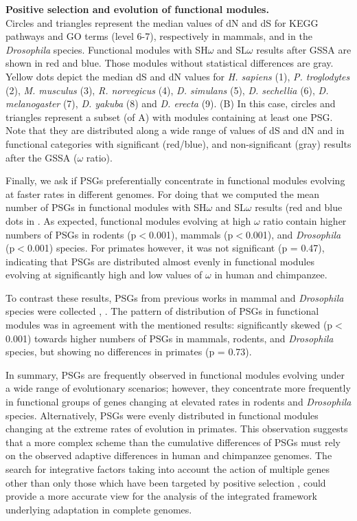\begin{FPfigure}
\caption[ Positive selection and evolution of functional modules.]{{\bf  Positive selection and evolution of functional modules.} \\Circles and triangles represent the median values of dN and dS for KEGG pathways and GO terms (level 6-7), respectively in mammals, and in the \textit{Drosophila} species. Functional modules with SH$\omega$ and SL$\omega$ results after GSSA are shown in red and blue. Those modules without statistical differences are gray. Yellow dots depict the median dS and dN values for \textit{H. sapiens} (1), \textit{P. troglodytes} (2), \textit{M. musculus} (3), \textit{R. norvegicus} (4), \textit{D. simulans} (5), \textit{D. sechellia} (6), \textit{D. melanogaster} (7), \textit{D. yakuba} (8) and \textit{D. erecta} (9). (B) In this case, circles and triangles represent a subset (of A) with modules containing at least one PSG. Note that they are distributed along a wide range of values of dS and dN and in functional categories with significant (red/blue), and non-significant (gray) results after the GSSA ($\omega$ ratio).} 
\label{fig:gssa_psgs}
\end{FPfigure}

Finally, we ask if PSGs preferentially concentrate in functional modules evolving at faster rates in different genomes. For doing that we computed the mean number of PSGs in functional modules with SH$\omega$ and SL$\omega$ results (red and blue dots in . As expected, functional modules evolving at high $\omega$ ratio contain higher numbers of PSGs in rodents (p$<$0.001), mammals (p$<$0.001), and \textit{Drosophila} (p$<$0.001) species. For primates however, it was not significant (p = 0.47), indicating that PSGs are distributed almost evenly in functional modules evolving at significantly high and low values of $\omega$ in human and chimpanzee.

To contrast these results, PSGs from previous works in mammal and \textit{Drosophila} species were collected \cite{Clark2007}, \cite{Kosiol2008a}. The pattern of distribution of PSGs in functional modules was in agreement with the mentioned results: significantly skewed (p$<$0.001) towards higher numbers of PSGs in mammals, rodents, and \textit{Drosophila} species, but showing no differences in primates (p = 0.73).

In summary, PSGs are frequently observed in functional modules evolving under a wide range of evolutionary scenarios; however, they concentrate more frequently in functional groups of genes changing at elevated rates in rodents and \textit{Drosophila} species. Alternatively, PSGs were evenly distributed in functional modules changing at the extreme rates of evolution in primates. This observation suggests that a more complex scheme than the cumulative differences of PSGs must rely on the observed adaptive differences in human and chimpanzee genomes. The search for integrative factors taking into account the action of multiple genes other than only those which have been targeted by positive selection \cite{He2010}, could provide a more accurate view for the analysis of the integrated framework underlying adaptation in complete genomes.

